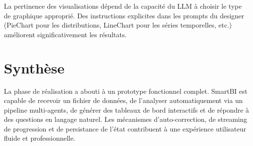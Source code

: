 La pertinence des visualisations dépend de la capacité du LLM à choisir le type de graphique approprié. Des instructions explicites dans les prompts du designer (PieChart pour les distributions, LineChart pour les séries temporelles, etc.) améliorent significativement les résultats.

\section{Synthèse}

La phase de réalisation a abouti à un prototype fonctionnel complet. SmartBI est capable de recevoir un fichier de données, de l'analyser automatiquement via un pipeline multi-agents, de générer des tableaux de bord interactifs et de répondre à des questions en langage naturel. Les mécanismes d'auto-correction, de streaming de progression et de persistance de l'état contribuent à une expérience utilisateur fluide et professionnelle.

